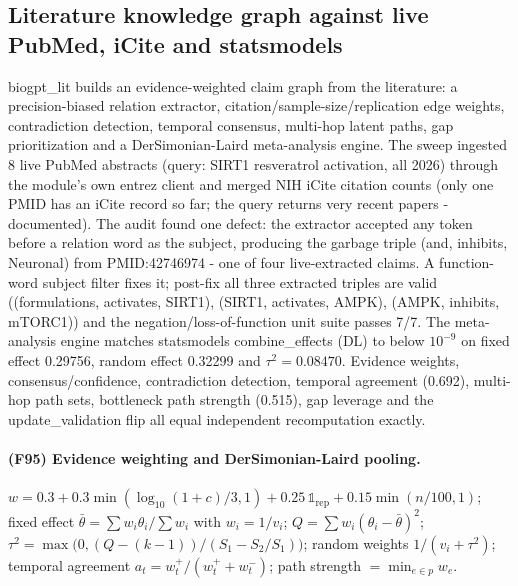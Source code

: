 \subsection{Literature knowledge graph against live PubMed, iCite and statsmodels}
biogpt\_lit builds an evidence-weighted claim graph from the literature: a precision-biased relation extractor, citation/sample-size/replication edge weights, contradiction detection, temporal consensus, multi-hop latent paths, gap prioritization and a DerSimonian-Laird meta-analysis engine. The sweep ingested 8 live PubMed abstracts (query: SIRT1 resveratrol activation, all 2026) through the module's own entrez client and merged NIH iCite citation counts (only one PMID has an iCite record so far; the query returns very recent papers - documented). The audit found one defect: the extractor accepted any token before a relation word as the subject, producing the garbage triple (and, inhibits, Neuronal) from PMID:42746974 - one of four live-extracted claims. A function-word subject filter fixes it; post-fix all three extracted triples are valid ((formulations, activates, SIRT1), (SIRT1, activates, AMPK), (AMPK, inhibits, mTORC1)) and the negation/loss-of-function unit suite passes 7/7. The meta-analysis engine matches statsmodels combine\_effects (DL) to below $10^{-9}$ on fixed effect 0.29756, random effect 0.32299 and $\tau^2=0.08470$. Evidence weights, consensus/confidence, contradiction detection, temporal agreement (0.692), multi-hop path sets, bottleneck path strength (0.515), gap leverage and the update\_validation flip all equal independent recomputation exactly.
\paragraph{(F95) Evidence weighting and DerSimonian-Laird pooling.} $w=0.3+0.3\min(\log_{10}(1+c)/3,1)+0.25\,\mathbb{1}_{\mathrm{rep}}+0.15\min(n/100,1)$; fixed effect $\bar\theta=\sum w_i\theta_i/\sum w_i$ with $w_i=1/v_i$; $Q=\sum w_i(\theta_i-\bar\theta)^2$; $\tau^2=\max\!\big(0,(Q-(k-1))/(S_1-S_2/S_1)\big)$; random weights $1/(v_i+\tau^2)$; temporal agreement $a_t=w_t^+/(w_t^++w_t^-)$; path strength $=\min_{e\in p}w_e$.
